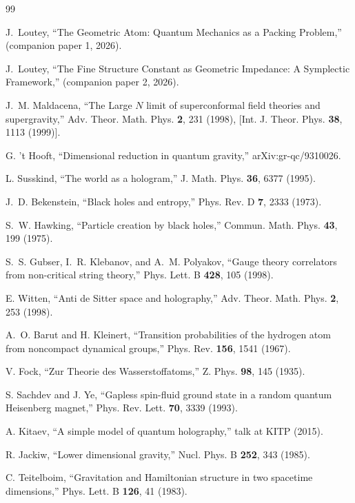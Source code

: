 \documentclass[aps,prd,twocolumn,superscriptaddress,floatfix]{revtex4-2}
\begin{document}
\begin{thebibliography}{99}

J.~Loutey,
``The Geometric Atom: Quantum Mechanics as a Packing Problem,''
(companion paper 1, 2026).

J.~Loutey,
``The Fine Structure Constant as Geometric Impedance: A Symplectic Framework,''
(companion paper 2, 2026).

J.~M. Maldacena,
``The Large $N$ limit of superconformal field theories and supergravity,''
Adv. Theor. Math. Phys. \textbf{2}, 231 (1998), [Int. J. Theor. Phys. \textbf{38}, 1113 (1999)].

G. 't Hooft,
``Dimensional reduction in quantum gravity,''
arXiv:gr-qc/9310026.

L. Susskind,
``The world as a hologram,''
J. Math. Phys. \textbf{36}, 6377 (1995).

J.~D. Bekenstein,
``Black holes and entropy,''
Phys. Rev. D \textbf{7}, 2333 (1973).

S.~W. Hawking,
``Particle creation by black holes,''
Commun. Math. Phys. \textbf{43}, 199 (1975).

S.~S. Gubser, I.~R. Klebanov, and A.~M. Polyakov,
``Gauge theory correlators from non-critical string theory,''
Phys. Lett. B \textbf{428}, 105 (1998).

E. Witten,
``Anti de Sitter space and holography,''
Adv. Theor. Math. Phys. \textbf{2}, 253 (1998).

A.~O. Barut and H. Kleinert,
``Transition probabilities of the hydrogen atom from noncompact dynamical groups,''
Phys. Rev. \textbf{156}, 1541 (1967).

V. Fock,
``Zur Theorie des Wasserstoffatoms,''
Z. Phys. \textbf{98}, 145 (1935).

S. Sachdev and J. Ye,
``Gapless spin-fluid ground state in a random quantum Heisenberg magnet,''
Phys. Rev. Lett. \textbf{70}, 3339 (1993).

A. Kitaev,
``A simple model of quantum holography,''
talk at KITP (2015).

R. Jackiw,
``Lower dimensional gravity,''
Nucl. Phys. B \textbf{252}, 343 (1985).

C. Teitelboim,
``Gravitation and Hamiltonian structure in two spacetime dimensions,''
Phys. Lett. B \textbf{126}, 41 (1983).


\end{thebibliography}
\end{document}
